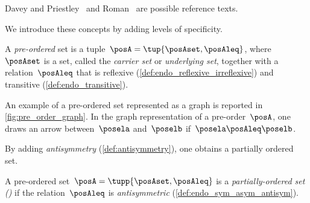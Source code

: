 Davey and Priestley~\cite{davey02} and Roman~\cite{roman08} are possible reference texts.

We introduce these concepts by adding levels of specificity.

\begin{ctdefinition}
    \label{def:preorder}
    A \emph{pre-ordered} set is a tuple~$\posA = \tup{\posAset,\posAleq}$, where~$\posAset$ is a set, called the \emph{carrier set} or \emph{underlying set}, together with a relation~$\posAleq$ that is
    reflexive (\cref{def:endo_reflexive_irreflexive}) and transitive (\cref{def:endo_transitive}).
\end{ctdefinition}
An example of a pre-ordered set represented as a graph is reported in \cref{fig:pre_order_graph}.
In the graph representation of a pre-order~$\posA$, one draws an arrow between~$\posela$ and~$\poselb$ if~$\posela \posAleq \poselb$.

\begin{marginfigure}
    \centering
    \caption{}
    \label{fig:pre_order_graph}
\end{marginfigure}

By adding \emph{antisymmetry} (\cref{def:antisymmetry}), one obtains a partially ordered set.
\begin{ctdefinition}
    \label{def:poset}
    A pre-ordered set~$\posA = \tupp{\posAset,\posAleq}$ is a \emph{partially-ordered set ()} if the relation~$\posAleq$ is \emph{antisymmetric} (\cref{def:endo_sym_asym_antisym}).
\end{ctdefinition}

